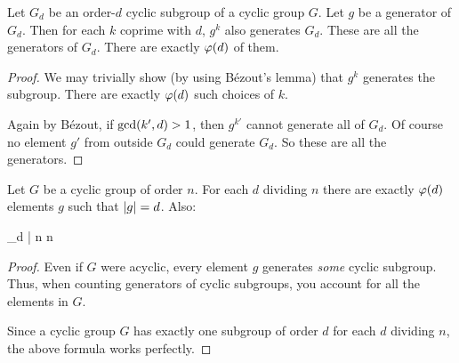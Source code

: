 \begin{proposition}
  Let $G_d$ be an order-$d$ cyclic subgroup of a cyclic group $G$. Let
  $g$ be a generator of $G_d$. Then for each $k$ coprime with $d$, $g^k$
  also generates $G_d$. These are all the generators of $G_d$. There are
  exactly $\varphi\mathopen{}\left( {d} \right)\mathclose{}$ of them.
\end{proposition}

\begin{proof}
  We may trivially show (by using Bézout's lemma) that $g^k$ generates
  the subgroup. There are exactly $\varphi\mathopen{}\left( {d} \right)\mathclose{}$ such choices of $k$.

  Again by Bézout, if $\gcd\mathopen{}\left( {k', d} \right)\mathclose{} > 1$, then $g^{k'}$ cannot generate
  all of $G_d$. Of course no element $g'$ from outside $G_d$ could
  generate $G_d$. So these are all the generators.
\end{proof}

\begin{corollary}
  Let $G$ be a cyclic group of order $n$. For each $d$ dividing $n$
  there are exactly $\varphi\mathopen{}\left( {d} \right)\mathclose{}$ elements $g$ such that $|g| = d$.
  Also:

  \begin{nedqn}
    \sum_{d | n} 
  \eqcol
    n
  \end{nedqn}
\end{corollary}

\begin{proof}
  Even if $G$ were acyclic, every element $g$ generates \emph{some}
  cyclic subgroup. Thus, when counting generators of cyclic subgroups,
  you account for all the elements in $G$.

  Since a cyclic group $G$ has exactly one subgroup of order $d$
  for each $d$ dividing $n$, the above formula works perfectly.
\end{proof}
